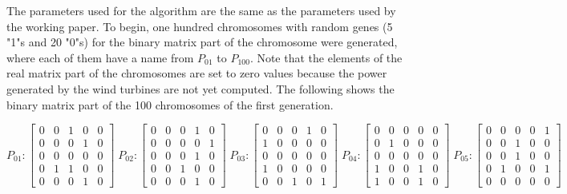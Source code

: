The parameters used for the algorithm are the same as the parameters used by the working paper. To begin, one hundred chromosomes with random genes (5 "1"s and 20 "0"s) for the binary matrix part of the chromosome were generated, where each of them have a name from $P_{01}$ to $P_{100}$. Note that the elements of the real matrix part of the chromosomes are set to zero values because the power generated by the wind turbines are not yet computed. The following shows the binary matrix part of the 100 chromosomes of the first generation.
    
    \singlespacing
    \fontsize{10}{12}\selectfont
    $$
        P_{01} : \begin{bmatrix}
            0 & 0 & 1 & 0 & 0 \\
            0 & 0 & 0 & 1 & 0 \\
            0 & 0 & 0 & 0 & 0 \\
			0 & 1 & 1 & 0 & 0 \\
            0 & 0 & 0 & 1 & 0 
        \end{bmatrix}
        \;
         P_{02} : \begin{bmatrix}
            0 & 0 & 0 & 1 & 0 \\
            0 & 0 & 0 & 0 & 1 \\
            0 & 0 & 0 & 1 & 0 \\
            0 & 0 & 1 & 0 & 0 \\
            0 & 0 & 0 & 1 & 0
        \end{bmatrix}
        \;
        P_{03} : \begin{bmatrix}
            0 & 0 & 0 & 1 & 0 \\
            1 & 0 & 0 & 0 & 0 \\
            0 & 0 & 0 & 0 & 0 \\
            1 & 0 & 0 & 0 & 0 \\
            0 & 0 & 1 & 0 & 1
        \end{bmatrix}
        \;
        P_{04} : \begin{bmatrix}
            0 & 0 & 0 & 0 & 0 \\
            0 & 1 & 0 & 0 & 0 \\
            0 & 0 & 0 & 0 & 0 \\
            1 & 0 & 0 & 1 & 0 \\
            1 & 0 & 0 & 1 & 0
        \end{bmatrix}
        \;
        P_{05} : \begin{bmatrix}
            0 & 0 & 0 & 0 & 1 \\
            0 & 0 & 1 & 0 & 0 \\
            0 & 0 & 1 & 0 & 0 \\
            0 & 1 & 0 & 0 & 1 \\
            0 & 0 & 0 & 0 & 0
        \end{bmatrix}
    $$

